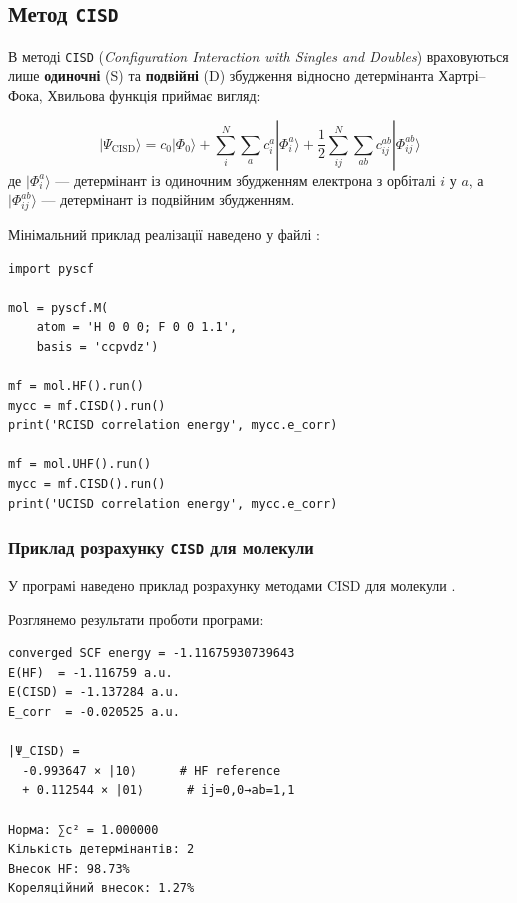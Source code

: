 \subsection{Метод \texttt{CISD}}


В методі \texttt{CISD} (\emph{Configuration Interaction with Singles and Doubles})
враховуються лише \textbf{одиночні} (S) та \textbf{подвійні} (D) збудження
відносно детермінанта Хартрі–Фока, Хвильова функція приймає вигляд:

\begin{equation}\label{eq:CI}
|\Psi_{\text{CISD}}\rangle = c_0|\Phi_0\rangle
+ \sum_i^N \sum_a c_i^a |\Phi_i^a\rangle
+ \frac{1}{2}\sum_{ij}^{N} \sum_{ab} c_{ij}^{ab} |\Phi_{ij}^{ab}\rangle
\end{equation}
%
де $|\Phi_i^a\rangle$ --- детермінант із одиночним збудженням електрона з орбіталі $i$ у $a$,
а $|\Phi_{ij}^{ab}\rangle$ --- детермінант із подвійним збудженням.



Мінімальний приклад реалізації наведено у файлі :

\begin{verbatim}
import pyscf

mol = pyscf.M(
    atom = 'H 0 0 0; F 0 0 1.1',
    basis = 'ccpvdz')

mf = mol.HF().run()
mycc = mf.CISD().run()
print('RCISD correlation energy', mycc.e_corr)

mf = mol.UHF().run()
mycc = mf.CISD().run()
print('UCISD correlation energy', mycc.e_corr)
\end{verbatim}

\subsubsection{Приклад розрахунку \texttt{CISD} для молекули }

У програмі  наведено приклад розрахунку методами CISD для молекули .

Розглянемо результати проботи програми:

\begin{verbatim}
converged SCF energy = -1.11675930739643
E(HF)  = -1.116759 a.u.
E(CISD) = -1.137284 a.u.
E_corr  = -0.020525 a.u.

|Ψ_CISD⟩ =
  -0.993647 × |10⟩      # HF reference
  + 0.112544 × |01⟩      # ij=0,0→ab=1,1

Норма: ∑c² = 1.000000
Кількість детермінантів: 2
Внесок HF: 98.73%
Кореляційний внесок: 1.27%
\end{verbatim}

